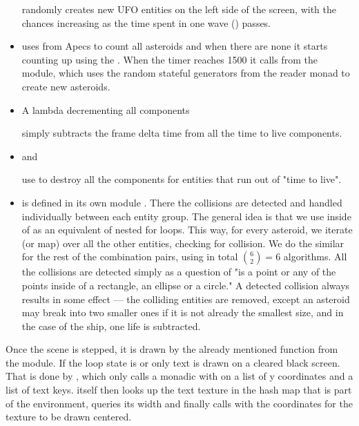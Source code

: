 \documentclass[
  digital, %
  color,   %
  table,   %
  oneside, %
  lof,     %
  lot,     %
]{fithesis3}
\begin{document}
\begin{itemize}[-]
    randomly creates new UFO entities on the left side of the screen,
    with the chances increasing as the time spent in one wave () passes.

    \item {}

    uses  from Apecs to count all asteroids and
    when there are none it starts counting up using the .
    When the timer reaches 1500 it calls 
    from the  module, which uses the random stateful
    generators from the  reader monad to create new asteroids.

    \item A lambda decrementing all  components

    simply subtracts the frame delta time  from all the time to live components.

    \item {} and 

    use  to destroy all the components for entities that run out of "time to live".

    \item {}

    is defined in its own module .
    There the collisions are detected and handled individually between each
    entity group. The general idea is that we use  inside of 
    as an equivalent of nested for loops. This way, for every asteroid,
    we iterate (or map) over all the other entities, checking for collision.
    We do the similar for the rest of the combination pairs,
    using in total $\binom{6}{2} = 6$ algorithms. All the collisions are detected
    simply as a question of "is a point or any of the points inside of a rectangle,
    an ellipse or a circle." A detected collision always results in some effect
    — the colliding entities are removed, except an asteroid may break into two
    smaller ones if it is not already the smallest size, and
    in the case of the ship, one life is subtracted.

\end{itemize}

Once the scene is stepped, it is drawn by the already mentioned 
function from the  module. If the loop state is  or
 only text is drawn on a cleared black screen. That is done by
, which only calls a monadic  with
 on a list of y coordinates and a list of text keys.
 itself then looks up the text texture in the
hash map that is part of the  environment,
queries its width and finally calls  with the coordinates
for the texture to be drawn centered.
\end{document}
